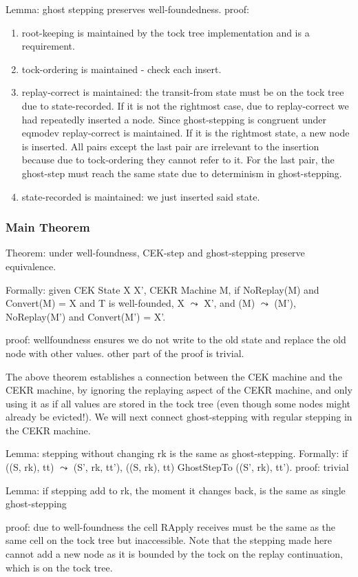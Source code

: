 Lemma: ghost stepping preserves well-foundedness.
proof:
\begin{enumerate}
    \item root-keeping is maintained by the tock tree implementation and is a requirement.
    \item tock-ordering is maintained - check each insert.
    \item replay-correct is maintained: the transit-from state must be on the tock tree due to state-recorded. If it is not the rightmost case, due to replay-correct we had repeatedly inserted a node. Since ghost-stepping is congruent under eqmodev replay-correct is maintained. If it is the rightmost state, a new node is inserted. All pairs except the last pair are irrelevant to the insertion because due to tock-ordering they cannot refer to it. For the last pair, the ghost-step must reach the same state due to determinism in ghost-stepping.
    \item state-recorded is maintained: we just inserted said state.
\end{enumerate}

\subsubsection{Main Theorem}
Theorem: under well-foundness, CEK-step and ghost-stepping preserve equivalence.

Formally: given CEK State X X', CEKR Machine M, if NoReplay(M) and Convert(M) = X and T is well-founded, X $\leadsto$ X', and (M) $\leadsto$ (M'), NoReplay(M') and Convert(M') = X'.

proof: wellfoundness ensures we do not write to the old state and replace the old node with other values. other part of the proof is trivial.

The above theorem establishes a connection between the CEK machine and the CEKR machine, by ignoring the replaying aspect of the CEKR machine, and only using it as if all values are stored in the tock tree (even though some nodes might already be evicted!). We will next connect ghost-stepping with regular stepping in the CEKR machine.

Lemma: stepping without changing rk is the same as ghost-stepping.
Formally: if ((S, rk), tt) $\leadsto$ (S', rk, tt'), ((S, rk), tt) GhostStepTo ((S', rk), tt').
proof: trivial

Lemma: if stepping add to rk, the moment it changes back, is the same as single ghost-stepping

proof: due to well-foundness the cell RApply receives must be the same as the same cell on the tock tree but inaccessible. Note that the stepping made here cannot add a new node as it is bounded by the tock on the replay continuation, which is on the tock tree.

